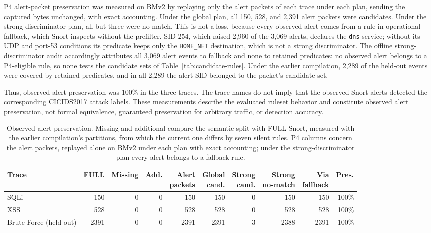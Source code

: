 \documentclass{article}
\begin{document}
P4 alert-packet preservation was measured on BMv2 by replaying only the
alert packets of each trace under each plan, sending the captured bytes
unchanged, with exact accounting. Under the global plan, all 150, 528, and
2,391 alert packets were candidates. Under the strong-discriminator plan, all
but three were no-match. This is not a loss, because every observed alert
comes from a rule in operational fallback, which Snort inspects without the
prefilter. SID 254, which raised 2,960 of the 3,069 alerts, declares the
\texttt{dns} service; without its UDP and port-53 conditions its predicate
keeps only the \texttt{HOME\_NET} destination, which is not a strong
discriminator. The offline strong-discriminator audit accordingly attributes
all 3,069 alert events to fallback and none to retained predicates: no
observed alert belongs to a P4-eligible rule, so none tests the candidate
sets of Table~\ref{tab:candidate-rules}. Under the earlier compilation, 2,289 of the held-out events were
covered by retained predicates, and in all 2,289 the alert SID belonged to
the packet's candidate set.

Thus, observed alert preservation was 100\% in the three traces. The trace
names do not imply that the observed Snort alerts detected the corresponding
CICIDS2017 attack labels. These measurements describe the evaluated ruleset
behavior and constitute observed alert preservation, not formal
equivalence, guaranteed preservation for arbitrary traffic, or detection
accuracy.

\begin{table}[h]
\centering
\scriptsize
\setlength{\tabcolsep}{2pt}
\caption{Observed alert preservation. Missing and additional compare the
semantic split with FULL Snort, measured with the earlier compilation's
partitions, from which the current one differs by seven silent rules. P4
columns concern the alert packets,
replayed alone on BMv2 under each plan with exact accounting; under the
strong-discriminator plan every alert belongs to a fallback rule.}
\label{tab:alert-preservation}
\begin{tabular}{lrrrrrrrrr}
\toprule
Trace & FULL & Missing & Add. & \shortstack{Alert\\packets} & \shortstack{Global\\cand.} & \shortstack{Strong\\cand.} & \shortstack{Strong\\no-match} & \shortstack{Via\\fallback} & Pres. \\
\midrule
SQLi & 150 & 0 & 0 & 150 & 150 & 0 & 150 & 150 & 100\% \\
XSS & 528 & 0 & 0 & 528 & 528 & 0 & 528 & 528 & 100\% \\
Brute Force (held-out) & 2391 & 0 & 0 & 2391 & 2391 & 3 & 2388 & 2391 & 100\% \\
\bottomrule
\end{tabular}
\end{table}
\end{document}
